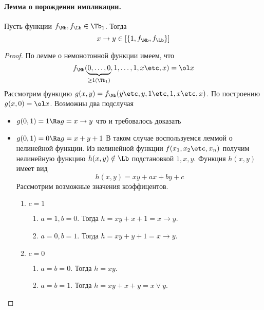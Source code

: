 \documentclass[unicode,10pt]{article}
\begin{document}
\paragraph{Лемма о порождении импликации.\\}
\begin{lemma}
  Пусть функции $\fM,\fL \in \Tb_1$. Тогда
  \begin{displaymath}
    x\to y \in \cls{1,\fM,\fL}
  \end{displaymath}
\end{lemma}
\begin{proof}
  По лемме о немонотонной функции имеем, что \WHY
  \begin{displaymath}
    \fM(\underbrace{0,\ldots,0}_{\ge 1(\Tb_1)},1,\ldots,1,x\etc,x)=\ol x
  \end{displaymath}
  Рассмотрим функцию $g(x,y)=\fM(y\etc,y,1\etc,1,x\etc,x)$. По построению $g(x,0)=\ol x$.
  Возможны два подслучая
  \begin{itemize}
    \item
      \begin{math}
        g(0,1)=1 \Ra g=x\to y
      \end{math}
      что и требовалось доказать
    \item
      \begin{math}
        g(0,1) = 0 \Ra g= x+y+1
      \end{math}
      В таком случае воспользуемся леммой о нелинейной функции.
      Из нелинейной функции $f(\set[x]{n})$ получим нелинейную функцию $h(x,y)\notin\Lb$
      подстановкой $1,x,y$.
      Функция $h(x,y)$ имеет вид
      \begin{displaymath}
        h(x,y) = xy+ax+by+c
      \end{displaymath}
      Рассмотрим возможные значения коэффицентов.
      \begin{enumerate}
        \item  $c=1$
          \begin{enumerate}
            \item $a=1,b=0$. Тогда $h=xy+x+1=x\to y$.
            \item $a=0,b=1$. Тогда $h=xy+y+1=x\to y$.
          \end{enumerate}
        \item $c=0$
          \begin{enumerate}
            \item $a=b=0$. Тогда $h=xy$.
            \item $a=b=1$. Тогда $h=xy+x+y=x\vee y$.
          \end{enumerate}
      \end{enumerate}
  \end{itemize}
\end{proof}
\end{document}
